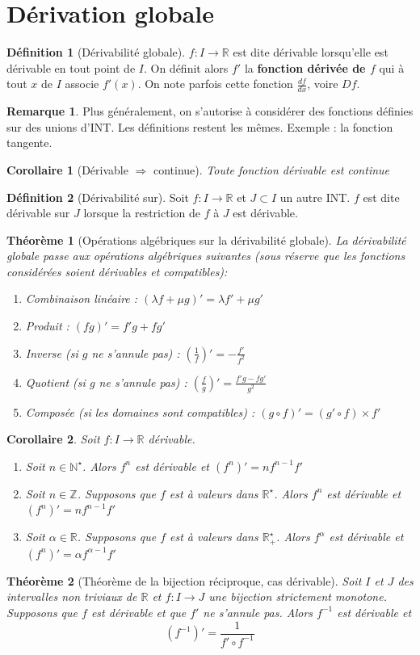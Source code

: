 \documentclass[french]{book}
\newcommand{\N}{\mathbb{N}}
\newcommand{\Z}{\mathbb{Z}}
\newcommand{\R}{\mathbb{R}}
\newcommand{\st}{^\star}
\newcommand{\inv}{^{-1}}
\theoremstyle{plain}
\newtheorem{thm}{Théorème}[chapter]
\newtheorem{cor}{Corollaire}[chapter]
\theoremstyle{definition}
\newtheorem{dfn}{Définition}[chapter]
\newtheorem{rmq}{Remarque}[chapter]
\theoremstyle{remark}
\begin{document}
\section{Dérivation globale}
\begin{dfn}[Dérivabilité globale]
	$f:I\rightarrow\R$ est dite dérivable lorsqu'elle est dérivable en tout point de $I$. On définit alors $f'$ la \textbf{fonction dérivée de $f$} qui à tout $x$ de $I$ associe $f'(x)$. On note parfois cette fonction $\displaystyle \frac{df}{dx}$, voire $Df$.
\end{dfn}
\begin{rmq} Plus généralement, on s'autorise à considérer des fonctions définies sur des unions d'INT. Les définitions restent les mêmes. Exemple : la fonction tangente. \end{rmq}
\begin{cor}[Dérivable $\Rightarrow$ continue]
	Toute fonction dérivable est continue
\end{cor}
\begin{dfn}[Dérivabilité sur]
	Soit $f:I\rightarrow\R$ et $J\subset I$ un autre INT. $f$ est dite dérivable sur $J$ lorsque la restriction de $f$ à $J$ est dérivable.
\end{dfn}
\begin{thm}[Opérations algébriques sur la dérivabilité globale]
	La dérivabilité globale passe aux opérations algébriques suivantes (sous réserve que les fonctions considérées soient dérivables et compatibles):
	\begin{enumerate}
		\item Combinaison linéaire : $(\lambda f +\mu g)'=\lambda f'+\mu g'$
		\item Produit : $(fg)'=f'g+fg'$
		\item Inverse (si $g$ ne s'annule pas) : $\displaystyle \left(\frac1f\right)'=-\frac{f'}{f^2}$
		\item Quotient (si $g$ ne s'annule pas) : $\displaystyle \left(\frac{f}{g}\right)'=\frac{f'g-fg'}{g^2}$
		\item Composée (si les domaines sont compatibles) : $(g\circ f)'=(g'\circ f)\times f'$
	\end{enumerate}
\end{thm}
\begin{cor}
	Soit $f:I\rightarrow\R$ dérivable.
	\begin{enumerate}
		\item Soit $n\in\N\st$. Alors $f^n$ est dérivable et $(f^n)'=nf^{n-1}f'$
		\item Soit $n\in\Z$. Supposons que $f$ est à valeurs dans $\R\st$. Alors $f^n$ est dérivable et $(f^n)'=nf^{n-1}f'$
		\item Soit $\alpha\in\R$. Supposons que $f$ est à valeurs dans $\R_+\st$. Alors $f^\alpha$ est dérivable et $(f^n)'=\alpha f^{\alpha-1}f'$
	\end{enumerate}
\end{cor}
\begin{thm}[Théorème de la bijection réciproque, cas dérivable]
	Soit $I$ et $J$ des intervalles non triviaux de $\R$ et $f:I\rightarrow J$ une bijection strictement monotone. Supposons que $f$ est dérivable et que $f'$ ne s'annule pas. Alors $f\inv$ est dérivable et $$(f\inv)'=\frac{1}{f'\circ f\inv}$$
\end{thm}
\end{document}
